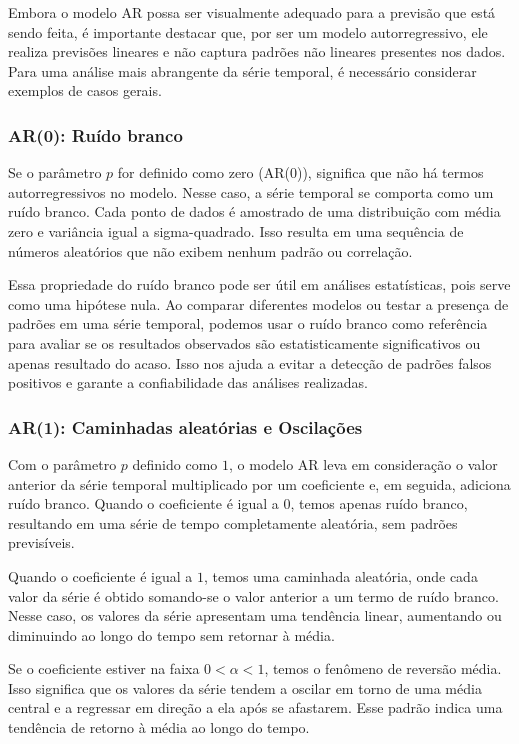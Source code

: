 Embora o modelo AR possa ser visualmente adequado para a previsão que está sendo feita, é importante destacar que, por ser um modelo autorregressivo, ele realiza previsões lineares e não captura padrões não lineares presentes nos dados. Para uma análise mais abrangente da série temporal, é necessário considerar exemplos de casos gerais.

\subsubsection{AR(0): Ru\'ido branco}

Se o parâmetro $p$ for definido como zero (AR($0$)), significa que não há termos autorregressivos no modelo. Nesse caso, a série temporal se comporta como um ruído branco. Cada ponto de dados é amostrado de uma distribuição com média zero e variância igual a sigma-quadrado. Isso resulta em uma sequência de números aleatórios que não exibem nenhum padrão ou correlação.

Essa propriedade do ruído branco pode ser útil em análises estatísticas, pois serve como uma hipótese nula. Ao comparar diferentes modelos ou testar a presença de padrões em uma série temporal, podemos usar o ruído branco como referência para avaliar se os resultados observados são estatisticamente significativos ou apenas resultado do acaso. Isso nos ajuda a evitar a detecção de padrões falsos positivos e garante a confiabilidade das análises realizadas.

\subsubsection{AR(1): Caminhadas aleat\'orias e Oscila\c c\~oes}

Com o parâmetro $p$ definido como $1$, o modelo AR leva em consideração o valor anterior da série temporal multiplicado por um coeficiente e, em seguida, adiciona ruído branco. Quando o coeficiente é igual a $0$, temos apenas ruído branco, resultando em uma série de tempo completamente aleatória, sem padrões previsíveis.

Quando o coeficiente é igual a $1$, temos uma caminhada aleatória, onde cada valor da série é obtido somando-se o valor anterior a um termo de ruído branco. Nesse caso, os valores da série apresentam uma tendência linear, aumentando ou diminuindo ao longo do tempo sem retornar à média.

Se o coeficiente estiver na faixa $0 < \alpha < 1$, temos o fenômeno de reversão média. Isso significa que os valores da série tendem a oscilar em torno de uma média central e a regressar em direção a ela após se afastarem. Esse padrão indica uma tendência de retorno à média ao longo do tempo.

